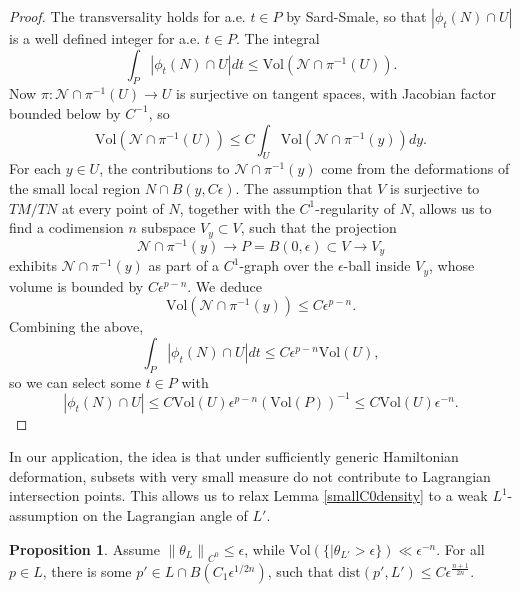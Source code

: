 \documentclass[a4paper]{article}
\theoremstyle{definition}
\newtheorem{prop}[thm]{Proposition}
\newcommand{\norm}[1]{\left\lVert#1\right\rVert}
\begin{document}
\begin{proof}
The transversality holds for a.e. $t\in P$ by Sard-Smale, so that $|\phi_t(N)\cap U|$ is a well defined integer for a.e. $t\in P$.
The integral 
\[
\int_P |\phi_t(N)\cap U| dt \leq \text{Vol}(\mathcal{N}\cap \pi^{-1}(U)).
\]
Now $\pi: \mathcal{N}\cap \pi^{-1}(U)\to U$ is surjective on tangent spaces, with Jacobian factor bounded below by $C^{-1}$, so 
\[
\text{Vol}(\mathcal{N}\cap \pi^{-1}(U))\leq C\int_U  \text{Vol}( \mathcal{N}\cap \pi^{-1}(y) ) dy.
\]
For each $y\in U$, the contributions to  $\mathcal{N}\cap \pi^{-1}(y) $ come from the deformations of the small local region $N\cap B(y, C\epsilon)$. The assumption that $V$ is surjective to $TM/TN$ at every point of $N$, together with the $C^1$-regularity of $N$, allows us to find a codimension $n$ subspace $V_y\subset V$, such that the projection
\[
\mathcal{N}\cap \pi^{-1}(y) \to P=B(0,\epsilon)\subset V\to V_y
\]
exhibits $\mathcal{N}\cap \pi^{-1}(y)$ as part of a $C^1$-graph over the $\epsilon$-ball inside $V_y$, whose volume is bounded by $C\epsilon^{p-n}$. We deduce 
\[
\text{Vol}(\mathcal{N}\cap \pi^{-1}(y) ) \leq C \epsilon^{p-n}.
\]
Combining the above,
\[
\int_P |\phi_t(N)\cap U| dt \leq C\epsilon^{p-n} \text{Vol}(U),
\]
so we can select some $t\in P$ with
\[
|\phi_t(N)\cap U| \leq C \text{Vol}(U)\epsilon^{p-n} (\text{Vol}(P))^{-1} \leq C\text{Vol}(U)\epsilon^{-n}.
\]
\end{proof}






In our application, the idea is that under sufficiently generic Hamiltonian deformation, subsets with very small measure do not contribute to Lagrangian intersection points. 
This allows us to relax Lemma \ref{smallC0density} to a weak $L^1$-assumption on the Lagrangian angle of $L'$.




\begin{prop}
Assume $\norm{\theta_L}_{C^0}\leq \epsilon$, while $\text{Vol}( \{  |\theta_{L'} > \epsilon      \}   )\ll \epsilon^{-n}$. 
For all $p\in L$, there is some $p'\in L\cap B(C_1\epsilon^{1/2n})$, such that $\text{dist}(p', L')\leq C\epsilon^{\frac{n+1}{2n}  }	 $.
\end{prop}
\end{document}
